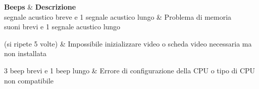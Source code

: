 \documentclass[a4paper,12pt,twoside]{article}
\begin{document}
{\begin{tcolorbox}[tab1,tabularx={X||X}]
		\end{tcolorbox}


	

	 


	\begin{tcolorbox}[tab2,tabularx={X||X}]
		\textbf{Beeps} & \textbf{Descrizione}  \\\hline{} segnale acustico breve e 1 segnale acustico lungo                                                                                                   & Problema di memoria             \\ suoni brevi e 1 segnale acustico lungo
		

		(si ripete 5 volte)                                                                                                    & Impossibile inizializzare video o scheda video necessaria ma non installata                               \\\hline
		
		3 beep 
		brevi e 1 beep lungo
		& Errore di configurazione della CPU o tipo di CPU non compatibile                                                                               \\ 
		
	\end{tcolorbox}

	}
\end{document}
